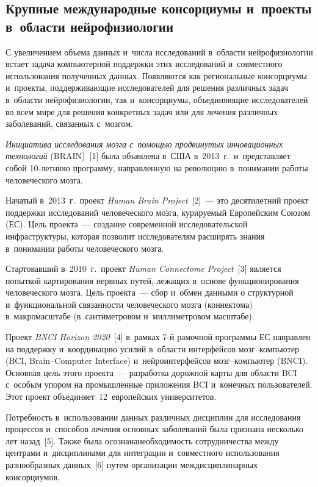 \begin{multicols}{2}
\section{Крупные международные консорциумы и~проекты 
в~области нейрофизиологии}

    С увеличением объема данных и~числа исследований в~области 
нейрофизиологии встает задача компьютерной поддержки этих исследований и~совместного использования полученных данных. Появляются как 
региональные консорциумы и~проекты, поддерживающие исследователей 
для решения различных задач в~области нейрофизиологии, так 
и~консорциумы, объединяющие исследователей во всем мире для решения 
конкретных задач или для лечения различных заболеваний, связанных 
с~мозгом.
    
    \textit{Инициатива исследования мозга с~помощью продвинутых 
инновационных технологий} (BRAIN)~[1] была объявлена 
в~США в~2013~г.\ и~представляет собой 10-лет\-нюю программу, 
направленную на революцию в~понимании работы человеческого мозга. 
    
    Начатый в~2013~г.\ проект \textit{Human Brain Project}~[2]~--- 
это десятилетний проект поддержки исследований человеческого мозга, 
курируемый Европейским Союзом (ЕС). Цель проекта~--- создание 
современной исследовательской инфраструктуры, которая позволит 
исследователям расширять знания в~понимании работы человеческого мозга. 
    
    Стартовавший в~2010~г.\ проект \textit{Human Connectome Project}~[3] 
    является попыткой картирования нервных путей, лежащих 
в~основе функционирования человеческого мозга. Цель проекта~--- сбор 
и~обмен данными о структурной и~функциональной связанности 
человеческого мозга (коннектома) в~макромасштабе (в~сантиметровом 
и~миллиметровом масштабе). 
    
    Проект \textit{BNCI Horizon 2020}~[4] в~рамках \mbox{7-й} рамочной программы 
ЕС направлен на поддержку и~координацию усилий в~области интерфейсов 
мозг--компьютер (BCI, Brain--Computer Interface) и~нейроинтерфейсов 
мозг--компьютер (\mbox{BNCI}). 
Основная цель этого проекта~--- разработка дорожной карты для области 
BCI с~особым упором на промышленные приложения BCI и~конечных 
пользователей. Этот проект объединяет~12~европейских университетов. 
    
    Потребность в~использовании данных различных дисциплин для 
исследования процессов и~способов лечения основных заболеваний была 
признана несколько лет назад~[5]. Также была осознана\linebreak необходимость 
сотрудничества между центрами и~дисциплинами для интеграции 
и~совместного использования разнообразных данных~[6] путем организации 
междисциплинарных консорциумов.
    

\end{multicols}
